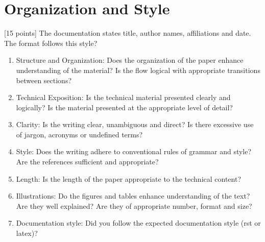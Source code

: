 \documentclass[letterpaper,10pt,english]{sphinxmanual}
\begin{document}
\section{Organization and Style}
\label{\detokenize{docs/rubric:organization-and-style}}
\sphinxAtStartPar
{[}15 points{]} The documentation states  title, author names, affiliations and date. The format follows this style?
\begin{enumerate}
%
\item {} 
\sphinxAtStartPar
Structure and Organization: Does the organization of the paper enhance understanding of the material? Is the flow logical with appropriate transitions between sections?

\item {} 
\sphinxAtStartPar
Technical Exposition: Is the technical material presented clearly and logically? Is the material presented at the appropriate level of detail?

\item {} 
\sphinxAtStartPar
Clarity: Is the writing clear, unambiguous and direct? Is there excessive use of jargon, acronyms or undefined terms?

\item {} 
\sphinxAtStartPar
Style: Does the writing adhere to conventional rules of grammar and style? Are the references sufficient and appropriate?

\item {} 
\sphinxAtStartPar
Length: Is the length of the paper appropriate to the technical content?

\item {} 
\sphinxAtStartPar
Illustrations: Do the figures and tables enhance understanding of the text? Are they well explained? Are they of appropriate number, format and size?

\item {} 
\sphinxAtStartPar
Documentation style: Did you follow the expected documentation style (rst or latex)?

\end{enumerate}
\end{document}

